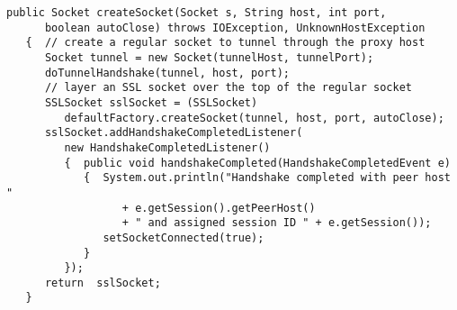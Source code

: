 \begin{lstlisting}[caption=SSL tunneling]
   public Socket createSocket(Socket s, String host, int port,
      boolean autoClose) throws IOException, UnknownHostException
   {  // create a regular socket to tunnel through the proxy host
      Socket tunnel = new Socket(tunnelHost, tunnelPort);
      doTunnelHandshake(tunnel, host, port);
      // layer an SSL socket over the top of the regular socket
      SSLSocket sslSocket = (SSLSocket)
         defaultFactory.createSocket(tunnel, host, port, autoClose);
      sslSocket.addHandshakeCompletedListener(
         new HandshakeCompletedListener()
         {  public void handshakeCompleted(HandshakeCompletedEvent e)
            {  System.out.println("Handshake completed with peer host "
                  + e.getSession().getPeerHost()
                  + " and assigned session ID " + e.getSession());
               setSocketConnected(true);
            }
         });
      return  sslSocket;
   }


\end{lstlisting}
